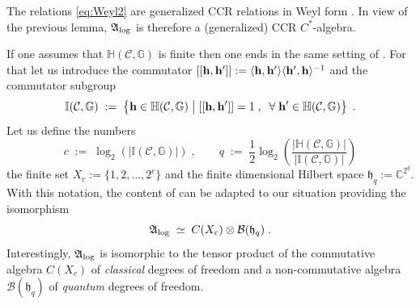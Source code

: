 \documentclass[a4paper,12pt,twoside,reqno]{amsart}
\theoremstyle{plain}
\theoremstyle{definition}
\theoremstyle{remark}
\numberwithin{equation}{section}
\numberwithin{figure}{section}
\numberwithin{table}{section}
\newcommand{\f}[1]{\mathcal{#1}}
\newcommand{\n}[1]{\mathbb{#1}}
\begin{document}
	
	
	The relations \eqref{eq:Weyl2} are generalized CCR relations in Weyl form \cite[Section 5.2.2.2]{bratelli2}. In view of the previous lemma, $\mathfrak{A}_{\rm log}$ is therefore a (generalized) CCR $C^*$-algebra.
	
	
	
	
	
	\medskip
	
	
	
	
	
	
	
	
	
	If
	one assumes that  $\n{H}(\f{C},\n{G})$ is finite then one ends in the same setting of  \cite[Lemma 6.4]{Vrana}.
	For that let us introduce the commutator $[[{\bf h},{\bf h}']]:=\langle {\bf h} ,{\bf h}'\rangle\langle {\bf h}' ,{\bf h}\rangle^{-1}$ and the commutator subgroup
	\[
	\n{I}(\f{C},\n{G})\;:=\; \left\{{\bf h}\in \n{H}(\f{C},\n{G})\;\big|\;[[{\bf h},{\bf h}']]=1\;,\;\;\forall\; {\bf h}'\in  \n{H}(\f{C},\n{G})\right\}\;.
	\]
	Let us define the numbers
	\[
	c\;:=\; \log_2(|\n{I}(\f{C},\n{G})|)\;,\qquad q\;:=\;\frac{1}{2}\log_2\left(\frac{|\n{H}(\f{C},\n{G})|}{|\n{I}(\f{C},\n{G})|}\right)
	\]
	the finite set $X_c:=\{1,2,\ldots,2^c\}$ and the finite dimensional Hilbert space $\mathfrak{h}_q:=\n{C}^{2^q}$. With this notation, the content of \cite[Lemma 6.4]{Vrana} can be adapted to our situation providing the isomorphism
	\begin{equation}\label{eq:trivial bundle}
		\mathfrak{A}_{\rm log}\;\simeq\; C(X_c)\otimes \mathcal{B}(\mathfrak{h}_q)\;.
	\end{equation}
	Interestingly,  $\mathfrak{A}_{\rm log}$ is isomorphic to the tensor product of the commutative algebra $C(X_c)$ of \emph{classical} degrees of freedom and a non-commutative algebra $\mathcal{B}(\mathfrak{h}_q)$
	of \emph{quantum} degrees of freedom. 
	
	
	
	
	\medskip
	
	
	
\end{document}
